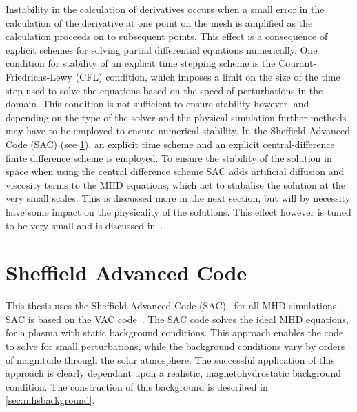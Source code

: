 \documentclass[a4paper,12pt,fourier,authoryear,custommargin]{Classes/PhDThesisPSnPDF}
\begin{document}
Instability in the calculation of derivatives occurs when a small error in the calculation of the derivative at one point on the mesh is amplified as the calculation proceeds on to subsequent points.
This effect is a consequence of explicit schemes for solving partial differential equations numerically.
One condition for stability of an explicit time stepping scheme is the Courant-Friedrichs-Lewy (CFL) condition, which imposes a limit on the size of the time step used to solve the equations based on the speed of perturbations in the domain.
This condition is not sufficient to ensure stability however, and depending on the type of the solver and the physical simulation further methods may have to be employed to ensure numerical stability.
In the Sheffield Advanced Code (SAC) (see \cref{sec:SAC}), an explicit time scheme and an explicit central-difference finite difference scheme is employed.
To ensure the stability of the solution in space when using the central difference scheme SAC adds artificial diffusion and viscosity terms to the MHD equations, which act to stabalise the solution at the very small scales.
This is discussed more in the next section, but will by necessity have some impact on the physicality of the solutions.
This effect however is tuned to be very small and is discussed in~\citep{shelyag2008}.


\section{Sheffield Advanced Code}\label{sec:SAC}

This thesis uses the Sheffield Advanced Code (SAC)~\citep{shelyag2008} for all MHD simulations, SAC is based on the VAC code~\citep{toth1996}.
The SAC code solves the ideal MHD equations, for a plasma with static background conditions.
This approach enables the code to solve for small perturbations, while the background conditions vary by orders of magnitude through the solar atmosphere.
The successful application of this approach is clearly dependant upon a realistic, magnetohydrostatic background condition.
The construction of this background is described in \cref{sec:mhsbackground}.
\end{document}
